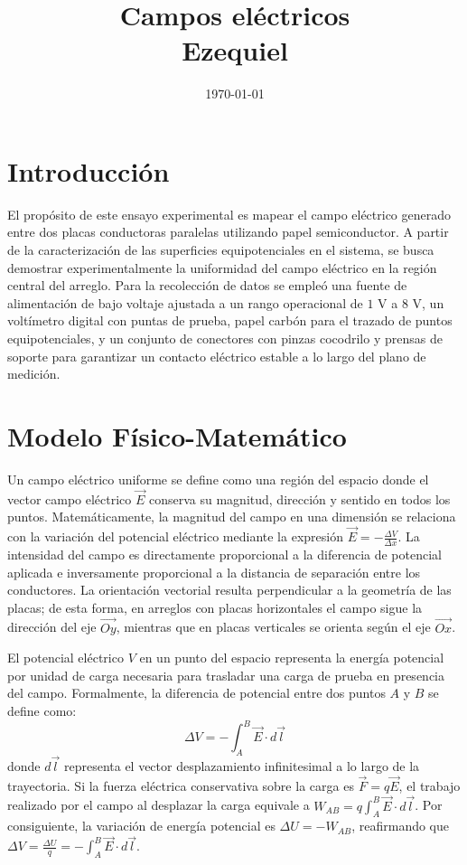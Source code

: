 \documentclass[12pt]{article}
\title{
    \textbf{\Huge{Campos eléctricos}}\\[0.3cm]
    \large{Ezequiel}
}
\date{\today}
\begin{document}
\maketitle

\section{Introducción}
El propósito de este ensayo experimental es mapear el campo eléctrico generado entre dos placas conductoras paralelas utilizando papel semiconductor. A partir de la caracterización de las superficies equipotenciales en el sistema, se busca demostrar experimentalmente la uniformidad del campo eléctrico en la región central del arreglo. Para la recolección de datos se empleó una fuente de alimentación de bajo voltaje ajustada a un rango operacional de $1\text{ V}$ a $8\text{ V}$, un voltímetro digital con puntas de prueba, papel carbón para el trazado de puntos equipotenciales, y un conjunto de conectores con pinzas cocodrilo y prensas de soporte para garantizar un contacto eléctrico estable a lo largo del plano de medición.

\section{Modelo Físico-Matemático}
Un campo eléctrico uniforme se define como una región del espacio donde el vector campo eléctrico $\overrightarrow{E}$ conserva su magnitud, dirección y sentido en todos los puntos. Matemáticamente, la magnitud del campo en una dimensión se relaciona con la variación del potencial eléctrico mediante la expresión $\overrightarrow{E} = -\frac{\Delta V}{\Delta x}$. La intensidad del campo es directamente proporcional a la diferencia de potencial aplicada e inversamente proporcional a la distancia de separación entre los conductores. La orientación vectorial resulta perpendicular a la geometría de las placas; de esta forma, en arreglos con placas horizontales el campo sigue la dirección del eje $\overrightarrow{Oy}$, mientras que en placas verticales se orienta según el eje $\overrightarrow{Ox}$.

El potencial eléctrico $V$ en un punto del espacio representa la energía potencial por unidad de carga necesaria para trasladar una carga de prueba en presencia del campo. Formalmente, la diferencia de potencial entre dos puntos $A$ y $B$ se define como:
\begin{equation}
    \Delta V = -\int_{A}^{B} \overrightarrow{E} \cdot d\overrightarrow{l}
\end{equation}
donde $d\overrightarrow{l}$ representa el vector desplazamiento infinitesimal a lo largo de la trayectoria. Si la fuerza eléctrica conservativa sobre la carga es $\overrightarrow{F} = q\overrightarrow{E}$, el trabajo realizado por el campo al desplazar la carga equivale a $W_{AB} = q \int_{A}^{B} \overrightarrow{E} \cdot d\overrightarrow{l}$. Por consiguiente, la variación de energía potencial es $\Delta U = -W_{AB}$, reafirmando que $\Delta V = \frac{\Delta U}{q} = -\int_{A}^{B} \overrightarrow{E} \cdot d\overrightarrow{l}$.
\end{document}
